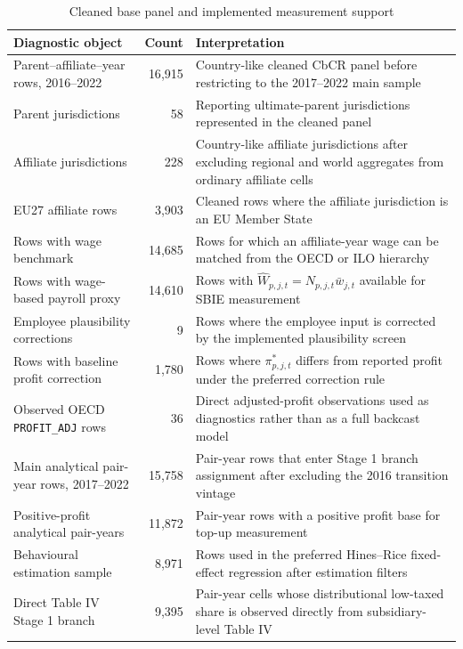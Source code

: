 \documentclass[11pt,a4paper]{article}
\newcommand{\code}[1]{\texttt{#1}}
\begin{document}
\begin{table}[H]
\centering
\caption{Cleaned base panel and implemented measurement support}
\label{tab:cleaned_panel_support}
\footnotesize
\begin{tabularx}{\textwidth}{@{}L{4.7cm}rX@{}}
\toprule
Diagnostic object & Count & Interpretation \\
\midrule
Parent--affiliate--year rows, 2016--2022 & 16{,}915 & Country-like cleaned CbCR panel before restricting to the 2017--2022 main sample \\
Parent jurisdictions & 58 & Reporting ultimate-parent jurisdictions represented in the cleaned panel \\
Affiliate jurisdictions & 228 & Country-like affiliate jurisdictions after excluding regional and world aggregates from ordinary affiliate cells \\
EU27 affiliate rows & 3{,}903 & Cleaned rows where the affiliate jurisdiction is an EU Member State \\
Rows with wage benchmark & 14{,}685 & Rows for which an affiliate-year wage can be matched from the OECD or ILO hierarchy \\
Rows with wage-based payroll proxy & 14{,}610 & Rows with $\hat{W}_{p,j,t}=N_{p,j,t}\bar{w}_{j,t}$ available for SBIE measurement \\
Employee plausibility corrections & 9 & Rows where the employee input is corrected by the implemented plausibility screen \\
Rows with baseline profit correction & 1{,}780 & Rows where $\pi^{*}_{p,j,t}$ differs from reported profit under the preferred correction rule \\
Observed OECD \code{PROFIT\_ADJ} rows & 36 & Direct adjusted-profit observations used as diagnostics rather than as a full backcast model \\
Main analytical pair-year rows, 2017--2022 & 15{,}758 & Pair-year rows that enter Stage 1 branch assignment after excluding the 2016 transition vintage \\
Positive-profit analytical pair-years & 11{,}872 & Pair-year rows with a positive profit base for top-up measurement \\
Behavioural estimation sample & 8{,}971 & Rows used in the preferred Hines--Rice fixed-effect regression after estimation filters \\
Direct Table IV Stage 1 branch & 9{,}395 & Pair-year cells whose distributional low-taxed share is observed directly from subsidiary-level Table IV \\

\end{tabularx}
\end{table}
\end{document}
